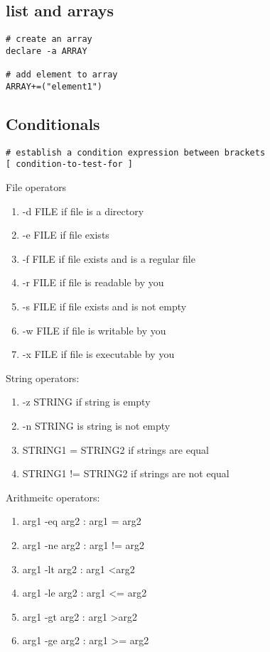 \documentclass[12pt,a4paper]{article}
\begin{document}
\subsection{list and arrays}
\begin{footnotesize}
\begin{verbatim}
# create an array
declare -a ARRAY

# add element to array
ARRAY+=("element1")
\end{verbatim}
\end{footnotesize}

\subsection{Conditionals}
\begin{footnotesize}
\begin{verbatim}
# establish a condition expression between brackets
[ condition-to-test-for ]
\end{verbatim}
\end{footnotesize}
File operators
\begin{enumerate}
	\item -d FILE if file is a directory
	\item -e FILE if file exists
	\item -f FILE if file exists and is a regular file
	\item -r FILE if file is readable by you
	\item -s FILE if file exists and is not empty
	\item -w FILE if file is writable by you
	\item -x FILE if file is executable by you 
\end{enumerate}
String operators:
\begin{enumerate}
	\item -z STRING if string is empty
	\item -n STRING is string is not empty
	\item STRING1 = STRING2 if strings are equal
	\item STRING1 != STRING2 if strings are not equal
\end{enumerate}
Arithmeitc operators:
\begin{enumerate}
	\item arg1 -eq arg2 : arg1 = arg2
	\item arg1 -ne arg2 : arg1 != arg2
	\item arg1 -lt arg2 : arg1 \textless arg2
	\item arg1 -le arg2 : arg1 \textless= arg2
	\item arg1 -gt arg2 : arg1 \textgreater arg2
	\item arg1 -ge arg2 : arg1 \textgreater= arg2
\end{enumerate}
\end{document}
